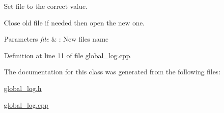 Set file to the correct value. 

Close old file if needed then open the new one.


\begin{DoxyParams}{Parameters}
{\em file} & \+: New file\textquotesingle{}s name \\
\hline
\end{DoxyParams}


Definition at line 11 of file global\+\_\+log.\+cpp.



The documentation for this class was generated from the following files\+:\begin{DoxyCompactItemize}
\item 
\hyperlink{global__log_8h}{global\+\_\+log.\+h}\item 
\hyperlink{global__log_8cpp}{global\+\_\+log.\+cpp}\end{DoxyCompactItemize}
